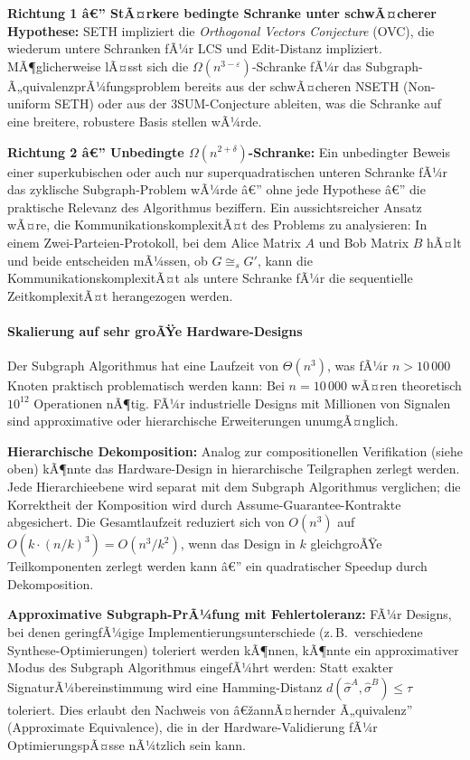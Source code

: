 ﻿\documentclass[12pt,a4paper]{report}
\begin{document}
\textbf{Richtung 1 â€” StÃ¤rkere bedingte Schranke unter schwÃ¤cherer Hypothese:}
SETH impliziert die \emph{Orthogonal Vectors Conjecture} (OVC), die wiederum untere
Schranken fÃ¼r LCS und Edit-Distanz impliziert. MÃ¶glicherweise lÃ¤sst sich die
$\Omega(n^{3-\varepsilon})$-Schranke fÃ¼r das Subgraph-Ã„quivalenzprÃ¼fungsproblem
bereits aus der schwÃ¤cheren NSETH (Non-uniform SETH) oder aus der
3SUM-Conjecture ableiten, was die Schranke auf eine breitere, robustere Basis stellen wÃ¼rde.

\textbf{Richtung 2 â€” Unbedingte $\Omega(n^{2+\delta})$-Schranke:}
Ein unbedingter Beweis einer superkubischen oder auch nur superquadratischen unteren
Schranke fÃ¼r das zyklische Subgraph-Problem wÃ¼rde â€” ohne jede Hypothese â€” die praktische
Relevanz des Algorithmus beziffern. Ein aussichtsreicher Ansatz wÃ¤re, die
KommunikationskomplexitÃ¤t des Problems zu analysieren: In einem Zwei-Parteien-Protokoll,
bei dem Alice Matrix $A$ und Bob Matrix $B$ hÃ¤lt und beide entscheiden mÃ¼ssen, ob
$G \cong_s G'$, kann die KommunikationskomplexitÃ¤t als untere Schranke fÃ¼r die
sequentielle ZeitkomplexitÃ¤t herangezogen werden.

\paragraph{Skalierung auf sehr groÃŸe Hardware-Designs}

Der Subgraph Algorithmus hat eine Laufzeit von $\Theta(n^3)$, was fÃ¼r $n > 10\,000$
Knoten praktisch problematisch werden kann: Bei $n = 10\,000$ wÃ¤ren theoretisch
$10^{12}$ Operationen nÃ¶tig. FÃ¼r industrielle Designs mit Millionen von Signalen
sind approximative oder hierarchische Erweiterungen unumgÃ¤nglich.

\textbf{Hierarchische Dekomposition:} Analog zur compositionellen Verifikation (siehe
oben) kÃ¶nnte das Hardware-Design in hierarchische Teilgraphen zerlegt werden.
Jede Hierarchieebene wird separat mit dem Subgraph Algorithmus verglichen; die
Korrektheit der Komposition wird durch Assume-Guarantee-Kontrakte abgesichert. Die
Gesamtlaufzeit reduziert sich von $O(n^3)$ auf $O(k \cdot (n/k)^3) = O(n^3 / k^2)$,
wenn das Design in $k$ gleichgroÃŸe Teilkomponenten zerlegt werden kann â€” ein quadratischer
Speedup durch Dekomposition.

\textbf{Approximative Subgraph-PrÃ¼fung mit Fehlertoleranz:} FÃ¼r Designs, bei denen
geringfÃ¼gige Implementierungsunterschiede (z.\,B.\ verschiedene Synthese-Optimierungen)
toleriert werden kÃ¶nnen, kÃ¶nnte ein approximativer Modus des Subgraph Algorithmus
eingefÃ¼hrt werden: Statt exakter SignaturÃ¼bereinstimmung wird eine Hamming-Distanz
$d(\hat{\sigma}^A, \hat{\sigma}^B) \leq \tau$ toleriert. Dies erlaubt den Nachweis
von â€žannÃ¤hernder Ã„quivalenz'' (Approximate Equivalence), die in der
Hardware-Validierung fÃ¼r OptimierungspÃ¤sse nÃ¼tzlich sein kann.
\end{document}

